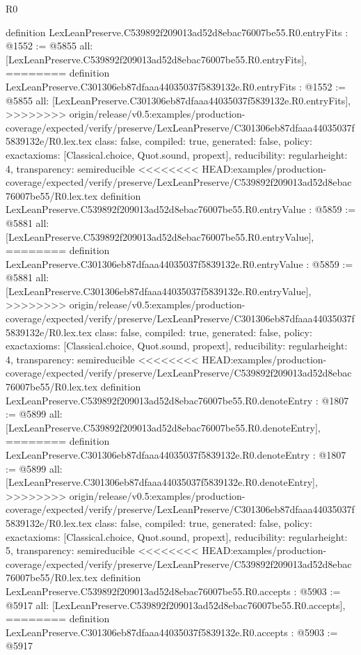 \begin{lexlean}{R0}
\begin{coremodule}
{{{{{{{{{{{{{{{{{{{{{{{{{{{{{{{{{{{{{{{{{{{{{{{{{{{{{{{{{{{{{{{{{{{{{{{{{{{{{{{{{{{{{{{{{{{{{{{{{{definition LexLeanPreserve.C539892f209013ad52d8ebac76007be55.R0.entryFits : @1552 := @5855 {
  all: [LexLeanPreserve.C539892f209013ad52d8ebac76007be55.R0.entryFits],
========
definition LexLeanPreserve.C301306eb87dfaaa44035037f5839132e.R0.entryFits : @1552 := @5855 {
  all: [LexLeanPreserve.C301306eb87dfaaa44035037f5839132e.R0.entryFits],
>>>>>>>> origin/release/v0.5:examples/production-coverage/expected/verify/preserve/LexLeanPreserve/C301306eb87dfaaa44035037f5839132e/R0.lex.tex
  class: false,
  compiled: true,
  generated: false,
  policy: exact{axioms: [Classical.choice, Quot.sound, propext]},
  reducibility: regular{height: 4},
  transparency: semireducible
}
<<<<<<<< HEAD:examples/production-coverage/expected/verify/preserve/LexLeanPreserve/C539892f209013ad52d8ebac76007be55/R0.lex.tex
definition LexLeanPreserve.C539892f209013ad52d8ebac76007be55.R0.entryValue : @5859 := @5881 {
  all: [LexLeanPreserve.C539892f209013ad52d8ebac76007be55.R0.entryValue],
========
definition LexLeanPreserve.C301306eb87dfaaa44035037f5839132e.R0.entryValue : @5859 := @5881 {
  all: [LexLeanPreserve.C301306eb87dfaaa44035037f5839132e.R0.entryValue],
>>>>>>>> origin/release/v0.5:examples/production-coverage/expected/verify/preserve/LexLeanPreserve/C301306eb87dfaaa44035037f5839132e/R0.lex.tex
  class: false,
  compiled: true,
  generated: false,
  policy: exact{axioms: [Classical.choice, Quot.sound, propext]},
  reducibility: regular{height: 4},
  transparency: semireducible
}
<<<<<<<< HEAD:examples/production-coverage/expected/verify/preserve/LexLeanPreserve/C539892f209013ad52d8ebac76007be55/R0.lex.tex
definition LexLeanPreserve.C539892f209013ad52d8ebac76007be55.R0.denoteEntry : @1807 := @5899 {
  all: [LexLeanPreserve.C539892f209013ad52d8ebac76007be55.R0.denoteEntry],
========
definition LexLeanPreserve.C301306eb87dfaaa44035037f5839132e.R0.denoteEntry : @1807 := @5899 {
  all: [LexLeanPreserve.C301306eb87dfaaa44035037f5839132e.R0.denoteEntry],
>>>>>>>> origin/release/v0.5:examples/production-coverage/expected/verify/preserve/LexLeanPreserve/C301306eb87dfaaa44035037f5839132e/R0.lex.tex
  class: false,
  compiled: true,
  generated: false,
  policy: exact{axioms: [Classical.choice, Quot.sound, propext]},
  reducibility: regular{height: 5},
  transparency: semireducible
}
<<<<<<<< HEAD:examples/production-coverage/expected/verify/preserve/LexLeanPreserve/C539892f209013ad52d8ebac76007be55/R0.lex.tex
definition LexLeanPreserve.C539892f209013ad52d8ebac76007be55.R0.accepts : @5903 := @5917 {
  all: [LexLeanPreserve.C539892f209013ad52d8ebac76007be55.R0.accepts],
========
definition LexLeanPreserve.C301306eb87dfaaa44035037f5839132e.R0.accepts : @5903 := @5917 {
}}}}}}}}}}}}}}}}}}}}}}}}}}}}}}}}}}}}}}}}}}}}}}}}}}}}}}}}}}}}}}}}}}}}}}}}}}}}}}}}}}}}}}}}}}}}}}}}}}}}}}}
\end{coremodule}
\end{lexlean}
